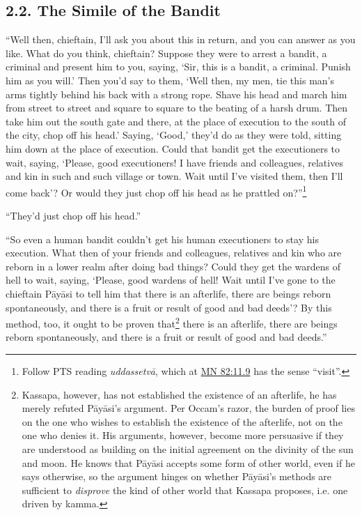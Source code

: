 \documentclass[12pt,openany]{book}%
\begin{document}
\subsection*{2.2. The Simile of the Bandit }

“Well then, chieftain, I’ll ask you about this in return, and you can answer as you like. What do you think, chieftain? Suppose they were to arrest a bandit, a criminal and present him to you, saying, ‘Sir, this is a bandit, a criminal. Punish him as you will.’ Then you’d say to them, ‘Well then, my men, tie this man’s arms tightly behind his back with a strong rope. Shave his head and march him from street to street and square to square to the beating of a harsh drum. Then take him out the south gate and there, at the place of execution to the south of the city, chop off his head.’ Saying, ‘Good,’ they’d do as they were told, sitting him down at the place of execution. Could that bandit get the executioners to wait, saying, ‘Please, good executioners! I have friends and colleagues, relatives and kin in such and such village or town. Wait until I’ve visited them, then I’ll come back’? Or would they just chop off his head as he prattled on?”\footnote{Follow PTS reading \textit{\textsanskrit{uddassetvā}}, which at \href{https://suttacentral.net/mn82/en/sujato\#11.9}{MN 82:11.9} has the sense “visit”. } 

“They’d just chop off his head.” 

“So even a human bandit couldn’t get his human executioners to stay his execution. What then of your friends and colleagues, relatives and kin who are reborn in a lower realm after doing bad things? Could they get the wardens of hell to wait, saying, ‘Please, good wardens of hell! Wait until I’ve gone to the chieftain \textsanskrit{Pāyāsi} to tell him that there is an afterlife, there are beings reborn spontaneously, and there is a fruit or result of good and bad deeds’? By this method, too, it ought to be proven that\footnote{Kassapa, however, has not established the existence of an afterlife, he has merely refuted \textsanskrit{Pāyāsi}’s argument. Per Occam’s razor, the burden of proof lies on the one who wishes to establish the existence of the afterlife, not on the one who denies it. His arguments, however, become more persuasive if they are understood as building on the initial agreement on the divinity of the sun and moon. He knows that \textsanskrit{Pāyāsi} accepts some form of other world, even if he says otherwise, so the argument hinges on whether \textsanskrit{Pāyāsi}’s methods are sufficient to \emph{disprove} the kind of other world that Kassapa proposes, i.e. one driven by kamma. } there is an afterlife, there are beings reborn spontaneously, and there is a fruit or result of good and bad deeds.” 
\end{document}
